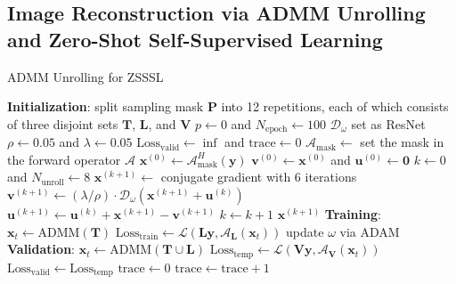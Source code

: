 \documentclass[journal,twoside,web]{ieeecolor}
\begin{document}
	\subsection{Image Reconstruction via ADMM Unrolling and Zero-Shot Self-Supervised Learning}

	\begin{algorithm}
		\caption{ADMM Unrolling for ZSSSL} \label{ALG:ADMM}
		\begin{algorithmic}[1]
			\State \textbf{Initialization}:
			\State \;\; split sampling mask $\mathbf{P}$ into 12 repetitions, each of which consists of three disjoint sets $\mathbf{T}$, $\mathbf{L}$, and $\mathbf{V}$
			\State \;\: $p \gets 0$ and $N_{\mathrm{epoch}} \gets 100$
			\State \;\; $\mathcal{D}_{\omega}$ set as ResNet
			\State \;\; $\rho \gets 0.05$ and $\lambda \gets 0.05$
			\State \;\; $\mathrm{Loss}_{\mathrm{valid}} \gets \inf$ and $\mathrm{trace} \gets 0$
			\State $\mathcal{A}_\mathrm{mask} \gets$ set the mask in the forward operator $\mathcal{A}$
			\State $\mathbf{x}^{(0)} \gets \mathcal{A}_\mathrm{mask}^H (\mathbf{y})$
			\State $\mathbf{v}^{(0)} \gets \mathbf{x}^{(0)}$ and $\mathbf{u}^{(0)} \gets \mathbf{0}$
			\State $k \gets 0$ and $N_{\mathrm{unroll}} \gets 8$
			\State $\mathbf{x}^{(k+1)} \gets $ conjugate gradient with 6 iterations
			\State $\mathbf{v}^{(k+1)} \gets (\lambda/\rho) \cdot \mathcal{D}_{\omega} (\mathbf{x}^{(k+1)} + \mathbf{u}^{(k)})$
			\State $\mathbf{u}^{(k+1)} \gets \mathbf{u}^{(k)} + \mathbf{x}^{(k+1)} - \mathbf{v}^{(k+1)}$
			\State $k \gets k+1$
			\EndWhile
			\State \Return $\mathbf{x}^{(k+1)}$
			\EndFunction
			\State \textbf{Training}:
			\State $\mathbf{x}_t \gets \mathrm{ADMM}(\mathbf{T})$
			\State $\mathrm{Loss}_{\mathrm{train}} \gets \mathcal{L}(\mathbf{L} \mathbf{y}, \mathcal{A}_\mathbf{L}(\mathbf{x}_t))$
			\State update $\omega$ via ADAM
			\State \textbf{Validation}:
			\State $\mathbf{x}_t \gets \mathrm{ADMM}(\mathbf{T} \cup \mathbf{L})$
			\State $\mathrm{Loss}_{\mathrm{temp}} \gets \mathcal{L}(\mathbf{V} \mathbf{y}, \mathcal{A}_\mathbf{V}(\mathbf{x}_t))$
			\State $\mathrm{Loss}_{\mathrm{valid}} \gets \mathrm{Loss}_{\mathrm{temp}}$
			\State $\mathrm{trace} \gets 0$
			\Else
			\State $\mathrm{trace} \gets \mathrm{trace} + 1$
			\EndIf
			\EndWhile
		\end{algorithmic}
	\end{algorithm}
\end{document}

